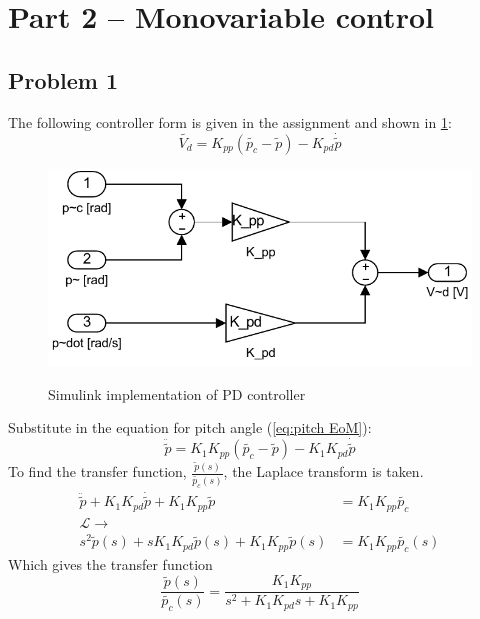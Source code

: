 
\section{Part 2 -- Monovariable control}
%
\subsection{Problem 1}
The following controller form is given in the assignment\cite[p.15]{assignment} and shown in \cref{fig:Pitch controller}:
%
\begin{equation}
  \label{eq:pd_controller}
  \tilde{V_d} = K_{pp}(\tilde{p_c} - \tilde{p}) - K_{pd} \dot{\tilde{p}}
\end {equation}
%
\begin{figure}[hbp]
\caption{Simulink implementation of PD controller}
	\centering
		\includegraphics{images/pd_pitch_control.pdf}
	\label{fig:Pitch controller}
\end{figure}
Substitute in the equation for pitch
angle (\cref{eq:pitch EoM}):
%
\begin{equation}
  \label{eq:pitch_with_pd}
  \ddot{\tilde{p}} = K_1 K_{pp}(\tilde{p_c} - \tilde{p}) - K_1 K_{pd}
  \dot{\tilde{p}}
\end{equation}
%
To find the transfer
function, $\frac{\tilde{p}(s)}{\tilde{p_c}(s)}$, the Laplace transform
is taken.
%
\begin{align*}
  \ddot{\tilde{p}} + K_1 K_{pd}\dot{\tilde{p}}
  + K_1K_{pp}\tilde{p} &= K_1 K_{pp}\tilde{p_c} \\
  \mathcal{L}\rightarrow&  \\
  s^2\tilde{p}(s) + sK_1K_{pd}\tilde{p}(s)
  + K_1K_{pp}\tilde{p}(s) &= K_1K_{pp}\tilde{p_c}(s)
\end{align*}
%
Which gives the transfer function
%
\begin{equation}
  \label{eq:trans_func}
  \frac{\tilde{p}(s)}{\tilde{p_c}(s)} =
  \frac{K_1K_{pp}}{s^2+K_1K_{pd}s+K_1K_{pp}}
\end{equation}

